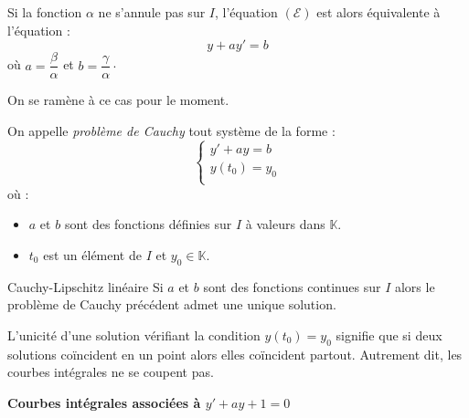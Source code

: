 \documentclass[french,11pt,twoside]{VcCours}
\begin{document}
Si la fonction $\alpha$ ne s'annule pas sur $I$, l'équation $(\mathcal{E})$ est alors équivalente à l'équation :
$$ y+ay'=b$$
où $a = \dfrac{\beta}{\alpha}$ et $b = \dfrac{\gamma}{\alpha} \cdot$



On se ramène à ce cas pour le moment.

\begin{Definition}{} On appelle \emph{problème de Cauchy} tout système de la forme :
$$ \left\lbrace \begin{array}{ccl}
y'+ay=b \\
y(t_0)=y_0 \\
\end{array}\right.$$
où :
\begin{itemize}
\item $a$ et $b$ sont des fonctions définies sur $I$ à valeurs dans $\mathbb{K}$.
\item $t_0$ est un élément de $I$ et $y_0 \in \mathbb{K}$.
\end{itemize}
\end{Definition}

\begin{Theoreme}{Cauchy-Lipschitz linéaire} Si $a$ et $b$ sont des fonctions continues sur $I$ alors le problème de Cauchy précédent admet une unique solution.
\end{Theoreme}

\begin{Remarque}{} L'unicité d'une solution vérifiant la condition $y(t_0)=y_0$ signifie que si deux solutions coïncident en un point alors elles coïncident partout. Autrement dit, les courbes intégrales ne se coupent pas.
\end{Remarque}


\begin{center}
\textbf{Courbes intégrales associées à $y'+ay+1=0$ }
\end{center}
\end{document}

